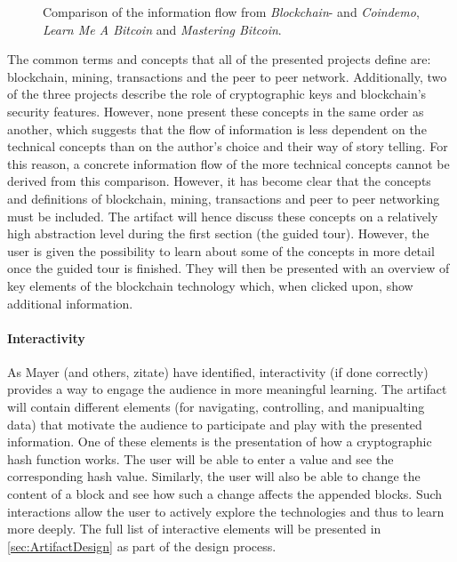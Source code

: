 \begin{figure}
    \centering
    
    \caption{Comparison of the information flow from \textit{Blockchain}- and \textit{Coindemo}, \textit{Learn Me A Bitcoin} and \textit{Mastering Bitcoin}.}
    \label{fig:ProcessBC}
\end{figure}

The common terms and concepts that all of the presented projects define are: blockchain, mining, transactions and the peer to peer network. Additionally, two of the three projects describe the role of cryptographic keys and blockchain's security features. However, none present these concepts in the same order as another, which suggests that the flow of information is less dependent on the technical concepts than on the author's choice and their way of story telling. For this reason, a concrete information flow of the more technical concepts cannot be derived from this comparison. However, it has become clear that the concepts and definitions of blockchain, mining, transactions and peer to peer networking must be included. The artifact will hence discuss these concepts on a relatively high abstraction level during the first section (the guided tour). However, the user is given the possibility to learn about some of the concepts in more detail once the guided tour is finished. They will then be presented with an overview of key elements of the blockchain technology which, when clicked upon, show additional information. 

\paragraph{Interactivity} As Mayer (and others, zitate) have identified, interactivity (if done correctly) provides a way to engage the audience in more meaningful learning. The artifact will contain different elements (for navigating, controlling, and manipualting data) that motivate the audience to participate and play with the presented information. One of these elements is the presentation of how a cryptographic hash function works. The user will be able to enter a value and see the corresponding hash value. Similarly, the user will also be able to change the content of a block and see how such a change affects the appended blocks. Such interactions allow the user to actively explore the technologies and thus to learn more deeply. The full list of interactive elements will be presented in \ref{sec:ArtifactDesign} as part of the design process. 

